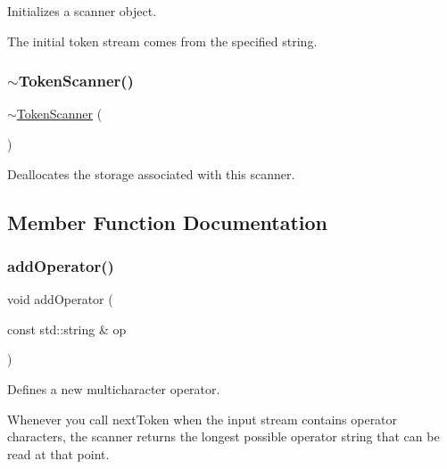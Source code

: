 Initializes a scanner object. 

The initial token stream comes from the specified string. \mbox{\label{classTokenScanner_a38bfeb2d700fbb486f5b3a4283419ae5}} 
\subsubsection{\texorpdfstring{$\sim$\+Token\+Scanner()}{~TokenScanner()}}
{\footnotesize\ttfamily $\sim$\mbox{\hyperlink{classTokenScanner}{Token\+Scanner}} (\begin{DoxyParamCaption}{ }\end{DoxyParamCaption})\hspace{0.3cm}{\ttfamily [virtual]}}



Deallocates the storage associated with this scanner. 



\subsection{Member Function Documentation}
\mbox{\label{classTokenScanner_a5256bb7e66b4509946204727182994f9}} 
\subsubsection{\texorpdfstring{add\+Operator()}{addOperator()}}
{\footnotesize\ttfamily void add\+Operator (\begin{DoxyParamCaption}\item[{const std\+::string \&}]{op }\end{DoxyParamCaption})}



Defines a new multicharacter operator. 

Whenever you call {\ttfamily next\+Token} when the input stream contains operator characters, the scanner returns the longest possible operator string that can be read at that point. \mbox{\label{classTokenScanner_aed3e8321a04deee5d8bebce0d6d715ac}} 

